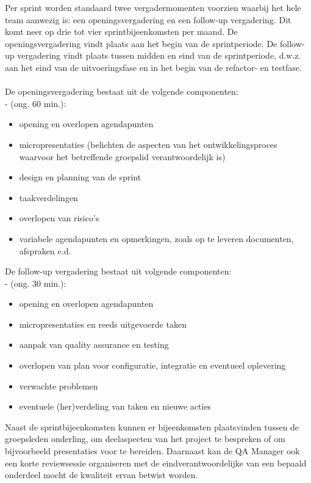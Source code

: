 \documentclass{article}
\begin{document}
Per sprint worden standaard twee vergadermomenten voorzien waarbij het hele team aanwezig is: een openingsvergadering en een follow-up vergadering. Dit komt neer op drie tot vier sprintbijeenkomsten per maand. De openingsvergadering vindt plaats aan het begin van de sprintperiode. De follow-up vergadering vindt plaats tussen midden en eind van de sprintperiode, d.w.z. aan het eind van de uitvoeringsfase en in het begin van de refactor- en testfase.\\
\\
\noindent De openingsvergadering bestaat uit de volgende componenten: \\
- (ong. 60 min.):
\begin{itemize}
\item opening en overlopen agendapunten
\item micropresentaties (belichten de aspecten van het ontwikkelingsproces waarvoor het betreffende groepslid verantwoordelijk is)
\item design en planning van de sprint
\item taakverdelingen
\item overlopen van risico's
\item variabele agendapunten en opmerkingen, zoals op te leveren documenten, afspraken e.d.
\end{itemize}


\noindent De follow-up vergadering bestaat uit volgende componenten:\\
- (ong. 30 min.):
\begin{itemize}
\item opening en overlopen agendapunten
\item micropresentaties en reeds uitgevoerde taken
\item aanpak van quality assurance en testing 
\item overlopen van plan voor configuratie, integratie en eventueel oplevering
\item verwachte problemen 
\item eventuele (her)verdeling van taken en nieuwe acties 
\end{itemize}

\noindent  Naast de sprintbijeenkomsten kunnen er bijeenkomsten plaatsvinden tussen de groepsleden onderling, om deelaspecten van het project te bespreken of om bijvoorbeeld presentaties voor te bereiden. Daarnaast kan de QA Manager ook een korte reviewsessie organiseren met de eindverantwoordelijke van een bepaald onderdeel mocht de kwaliteit ervan betwist worden. \\
\end{document}
